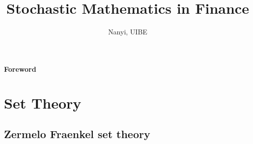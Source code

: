 \documentclass[12pt]{book}
\begin{document}
\title{Stochastic Mathematics in Finance}
\author{Nanyi, UIBE}
\maketitle %





\tableofcontents
\clearpage
{}
{\huge {\bf Foreword}}
\mainmatter

\chapter{Set Theory}

\section{Zermelo Fraenkel set theory}
\end{document}
